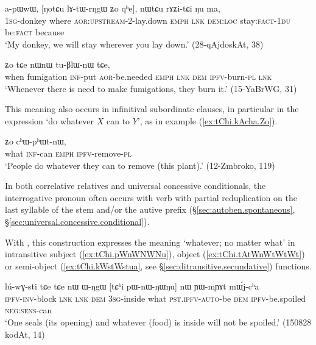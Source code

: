 \begin{exe}
\ex \label{ex:NotCu.lAtWrNgW}
\gll a-pɯwɯ, [ŋotɕu lɤ-tɯ-rŋgɯ ʑo qʰe], nɯtɕu rɤʑi-tɕi ŋu ma, \\
\textsc{1sg}-donkey where \textsc{aor}:\textsc{upstream}-2-lay.down \textsc{emph} \textsc{lnk} \textsc{dem}:\textsc{loc} stay:\textsc{fact}-\textsc{1du} be:\textsc{fact} because \\
\glt `My donkey, we will stay wherever you lay down.' (28-qAjdoskAt, 38)
\end{exe}  
 
\begin{exe}
\ex \label{ex:thAjtCu.fsaN}
 ʑo tɕe nɯnɯ tu-βlɯ-nɯ tɕe, \\
when fumigation \textsc{inf}-put \textsc{aor}-be.needed \textsc{emph} \textsc{lnk} \textsc{dem} \textsc{ipfv}-burn-\textsc{pl} \textsc{lnk} \\
\glt `Whenever there is need to make fumigations, they burn it.' (15-YaBrWG, 31)
\end{exe}  

This meaning also occurs in infinitival subordinate clauses, in particular in the expression  `do whatever $X$ can to $Y$', as in example (\ref{ex:tChi.kAcha.Zo}).

\begin{exe}
\ex \label{ex:tChi.kAcha.Zo}
 ʑo cʰɯ-pʰɯt-nɯ, \\
what \textsc{inf}-can \textsc{emph} \textsc{ipfv}-remove-\textsc{pl} \\
\glt `People do whatever they can to remove (this plant).' (12-Zmbroko, 119)
\end{exe}

In both correlative relatives and universal concessive conditionals, the interrogative pronoun often occurs with verb with partial reduplication on the last syllable of the stem and/or the autive  prefix (§\ref{sec:autoben.spontaneous}, §\ref{sec:universal.concessive.conditional}).

With , this construction expresses the meaning `whatever; no matter what' in intransitive subject (\ref{ex:tChi.pWnWNWNu}), object (\ref{ex:tChi.tAtWnWtWtWt}) or semi-object (\ref{ex:tChi.kWstWstua}, see §\ref{sec:ditransitive.secundative}) functions.

\begin{exe}
\ex \label{ex:tChi.pWnWNWNu}
\gll lú-wɣ-sti tɕe tɕe nɯ ɯ-ŋgɯ [tɕʰi pɯ-nɯ-ŋɯ\redp{}ŋu] nɯ ɲɯ-mɲɤt mɯ́j-cʰa \\
\textsc{ipfv}-\textsc{inv}-block \textsc{lnk} \textsc{lnk} \textsc{dem} \textsc{3sg}-inside what \textsc{pst}.\textsc{ipfv}-\textsc{auto}-be \textsc{dem} \textsc{ipfv}-be.spoiled \textsc{neg}:\textsc{sens}-can \\
\glt `One seals (its opening) and whatever (food) is inside will not be spoiled.' (150828 kodAt, 14)
\end{exe}  

